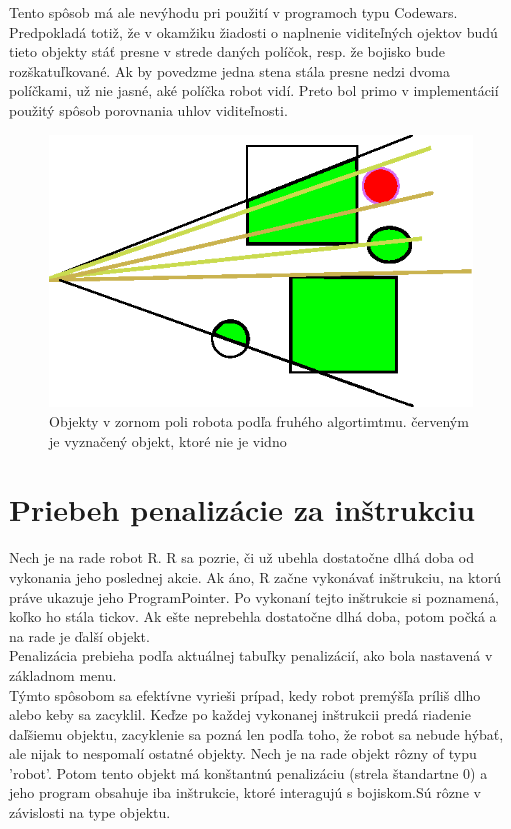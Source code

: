 \indent
\newline
\indent Tento spôsob má ale nevýhodu pri použití v programoch typu Codewars. Predpokladá totiž, že v okamžiku žiadosti o naplnenie viditeľných ojektov budú tieto objekty stáť presne v strede daných políčok, resp. že bojisko bude rozškatuľkované. Ak by povedzme jedna stena stála presne nedzi dvoma políčkami, už nie jasné, aké políčka robot vidí. Preto bol primo v implementácií použitý spôsob porovnania uhlov viditeľnosti.
\\
\begin{figure}
\centering
\includegraphics{visibility2}
\caption { Objekty v zornom poli robota podľa fruhého algortimtmu. červeným je vyznačený objekt, ktoré nie je vidno}
\label{fig:visibleo}
\end{figure}
\indent
\section{Priebeh penalizácie za inštrukciu}
Nech je na rade robot R. R sa pozrie, či už ubehla dostatočne dlhá doba od vykonania jeho poslednej akcie. Ak áno, R začne vykonávať inštrukciu, na ktorú práve ukazuje jeho ProgramPointer. Po vykonaní tejto inštrukcie si poznamená, koľko ho stála tickov. Ak ešte neprebehla dostatočne dlhá doba, potom počká a na rade je ďalší objekt. \\
Penalizácia prebieha podľa aktuálnej tabuľky penalizácií, ako bola nastavená v základnom menu. \\

Týmto spôsobom sa efektívne vyrieši prípad, kedy robot premýšľa príliš dlho alebo keby sa zacyklil. Keďze po každej vykonanej inštrukcii predá riadenie daľšiemu objektu, zacyklenie sa pozná len podľa toho, že robot sa nebude hýbať, ale nijak to nespomalí ostatné objekty.%
\newline
Nech je na rade objekt rôzny of typu 'robot'. Potom tento objekt má konštantnú penalizáciu (strela štandartne 0) a jeho program obsahuje iba inštrukcie, ktoré interagujú s bojiskom.Sú rôzne v závislosti na type objektu.

